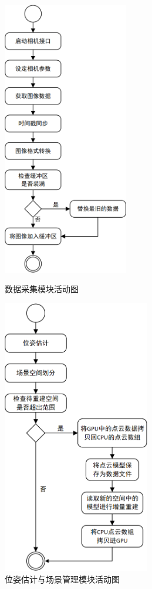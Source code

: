 \begin{figure}[htb]
	\centering
	\begin{minipage}[t]{0.45\linewidth}
		\centering
		\includegraphics[height=12cm,keepaspectratio]{figures/uml/activity1.png}
		\caption{数据采集模块活动图}
		\label{fig:activity1}
	\end{minipage}
	\begin{minipage}[t]{0.45\linewidth}
		\centering
		\includegraphics[height=12cm,keepaspectratio]{figures/uml/activity2.png}
		\caption{位姿估计与场景管理模块活动图}
		\label{fig:activity2}
	\end{minipage}
\end{figure}

